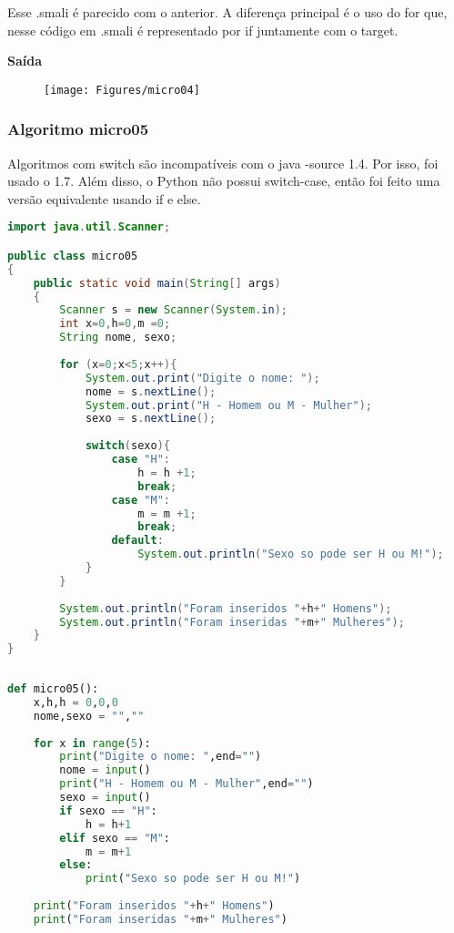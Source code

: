 \documentclass[hidelinks,12pt]{article}
\begin{document}
	Esse .smali é parecido com o anterior. A diferença principal é o uso do for que, nesse código em .smali é representado por if juntamente com o target.
	
	{\large{\textbf{Saída}}}
	
	\begin{figure}[!h]
		\centering
		\texttt{[image: Figures/micro04]}
	\end{figure}	
	
	
	\subsubsection{Algoritmo micro05}
	
	Algoritmos com switch são incompatíveis com o java -source 1.4. Por isso, foi usado o 1.7. Além disso, o Python não possui switch-case, então foi feito uma versão equivalente usando if e else.
	
	\begin{lstlisting}[caption=Código em Java,language=java]
import java.util.Scanner;

public class micro05
{
	public static void main(String[] args)
	{
		Scanner s = new Scanner(System.in);
		int x=0,h=0,m =0;
		String nome, sexo;
		
		for (x=0;x<5;x++){
			System.out.print("Digite o nome: ");
			nome = s.nextLine();
			System.out.print("H - Homem ou M - Mulher");
			sexo = s.nextLine();
			
			switch(sexo){
				case "H":
					h = h +1;
					break;
				case "M":
					m = m +1;
					break;
				default:
					System.out.println("Sexo so pode ser H ou M!");
			}	
		}
	
		System.out.println("Foram inseridos "+h+" Homens");
		System.out.println("Foram inseridas "+m+" Mulheres");
	}
}	
	
	\end{lstlisting}
	
	\begin{lstlisting}[caption=Código em python,language=Python]
def micro05():
	x,h,h = 0,0,0
	nome,sexo = "",""
	
	for x in range(5):
		print("Digite o nome: ",end="")
		nome = input()
		print("H - Homem ou M - Mulher",end="")
		sexo = input()
		if sexo == "H":
			h = h+1
		elif sexo == "M":
			m = m+1
		else:
			print("Sexo so pode ser H ou M!")
	
	print("Foram inseridos "+h+" Homens")
	print("Foram inseridas "+m+" Mulheres")	
	
	\end{lstlisting}
	
\end{document}
